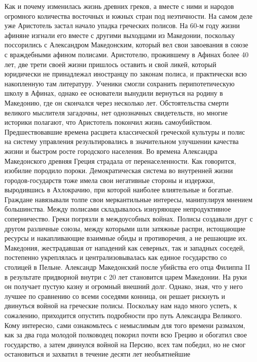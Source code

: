 Как и почему изменилась жизнь
древних греков, а вместе с ними и народов огромного количества восточных и южных
стран под неэтичности. На самом деле уже Аристотель застал начало упадка
греческих полисов. На 60-м году жизни афиняне изгнали его вместе с другими
выходцами из Македонии, поскольку поссорились с Александром Македонским, который
вел свои завоевания в союзе с враждебными афином полисами. Аристотелю,
прожившему в Афинах более 40 лет, две трети своей жизни пришлось оставить и свой
ликей, который юридически не принадлежал иностранцу по законам полиса, и
практически всю накопленную там литературу. Ученики смогли сохранить
перипотетическую школу в Афинах, однако ее основатели вынудили вернуться на
родину в Македонию, где он скончался через несколько лет. Обстоятельства смерти
великого мыслителя загадочны, нет однозначных свидетельств, но многие историки
полагают, что Аристотель покончил жизнь самоубийством. Предшествовавшие времена
расцвета классической греческой культуры и полис на систему управления
результировались в значительном улучшении качества жизни и быстром росте
городского населения. Во времена Александра Македонского древняя Греция страдала
от перенаселенности. Как говорится, изобилие породило пороки. Демократическая
система во внутренней жизни городов-государств тоже имела свои негативные
стороны и издержки, выродившись в Ахлокрачию, при которой наиболее влиятельные и
богатые. Граждане навязывали толпе свои меркантильные интересы, манипулируя
мнением большинства. Между полисами складывалось изнуряющее непродуктивное
соперничество. Греки погрязли в междоусобных войнах. Полисы создавали друг с
другом различные союзы, между которыми шли затяжные распри, истощающие ресурсы и
накапливающие взаимные обиды и противоречия, а не решающие их. Македония,
жестрадавшая от нападений как северных, так и западных соседей, постепенно
укреплялась и централизовывалась как единое государство со столицей в Пельне.
Александр Македонский после убийства его отца Филиппа II в результате придворной
внутри с 20 лет становится царем Македонии. На руки он получает пустую казну и
огромный внешний долг. Однако, зная, что у него лучшее по сравнению со всеми
соседями конница, он решает рискнуть и двинуться войной на греческие полисы.
Поскольку нам надо много успеть, к сожалению, приходится опустить подробности
про путь Александра Великого. Кому интересно, сами ознакомьтесь с немыслимым для
того времени размахом, как за два года молодой полководец покорил почти всю
Грецию и обогатил свое государство, а затем двинулся войной на Персию, всех там
победил, но не смог остановиться и захватил в течение десяти лет необъятнейшие
